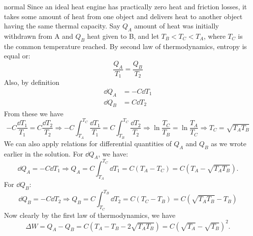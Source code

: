 \begin{solution}{normal}
Since an ideal heat engine has practically zero heat and friction losses, it takes some amount of heat from one object and delivers  heat to another object having the same thermal capacity. Say $Q_A$ amount of heat was initially withdrawn from A and $Q_B$ heat given to B, and let $T_B<T_C<T_A$, where $T_C$ is the common temperature reached. By second law of thermodynamics, entropy is equal or:
$$\frac{Q_A}{T_1} = \frac{Q_B}{T_2}$$ 
Also, by definition 
\begin{align*}
    \dd Q_A &= -C  \dd T_1 \\
    \dd Q_B &= C \dd T_2
\end{align*}
From these we have $$-C\frac{\dd T_1}{T_1} = C \frac{\dd T_2}{T_2} \Rightarrow -C\int_{T_A}^{T_C}{\frac{\dd T_1}{T_1}} = C \int_{T_B}^{T_C}{\frac{\dd T_2}{T_2}} \Rightarrow \ln{\frac{T_C}{T_B}} = \ln{\frac{T_A}{T_C}} \Rightarrow T_C = \sqrt{T_A T_B}$$
We can also apply relations for differential quantities of $Q_A$ and $Q_B$ as we wrote earlier in the solution. For $\dd Q_A$, we have:
$$\dd Q_A = -C\dd T_1 \Rightarrow Q_A = C\int_{T_A}^{T_C}{\dd T_1} = C (T_A - T_C) = C(T_A - \sqrt{T_A T_B}).$$
For $\dd Q_B$:
$$\dd Q_B = -C\dd T_2 \Rightarrow Q_B = C\int_{T_C}^{T_B}{\dd T_2} = C (T_C - T_B) = C(\sqrt{T_A T_B} - T_B)$$
Now clearly by the first law of thermodynamics, we have 
$$\Delta{W} = Q_A - Q_B = C (T_A - T_B - 2\sqrt{T_A T_B}) = C {(\sqrt{T_A} - \sqrt{T_B})}^2.$$
\end{solution}